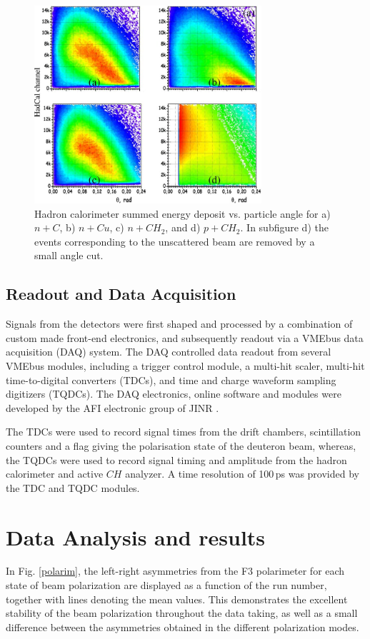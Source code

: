 \documentclass[twocolumn,epjc3]{svjour3}
\begin{document}
\begin{figure}
  \centering
  \includegraphics[width=0.75\textwidth]{fig12_Fig12.jpg}
  \caption{Hadron calorimeter summed energy deposit vs. particle angle for a) $n +C$, b) $n +Cu$, c) $n +CH_2$, and d) $p +CH_2$. In subfigure d) the events corresponding to the unscattered beam are removed by a small angle cut.}
  \label{Fig:hadcal-response}
\end{figure}

\subsection{Readout and Data Acquisition}
Signals from the detectors were first shaped and processed by a combination of custom made front-end electronics, and subsequently readout via a VMEbus data acquisition (DAQ) system. The DAQ controlled data readout from several VMEbus modules, including a trigger control module, a multi-hit scaler, multi-hit time-to-digital converters (TDCs), and time and charge waveform sampling digitizers (TQDCs). The DAQ electronics, online software and modules were developed by the AFI electronic group of JINR \cite{Strela:2013}.

The TDCs were used to record signal times from the drift chambers, scintillation counters and a flag giving the polarisation state of the deuteron beam, whereas, the TQDCs were used to record signal timing and amplitude from the hadron calorimeter and active $CH$ analyzer. A time resolution of 100\,ps was provided by the TDC and TQDC modules.

\section{Data Analysis and results}
In Fig. \ref{polarim}, the left-right asymmetries from the F3 polarimeter for each state of beam polarization are displayed as a function of the run number, together with lines denoting the mean values. This demonstrates the excellent stability of the beam polarization throughout the data taking, as well as a small difference between the asymmetries obtained in the different polarization modes.
\end{document}
